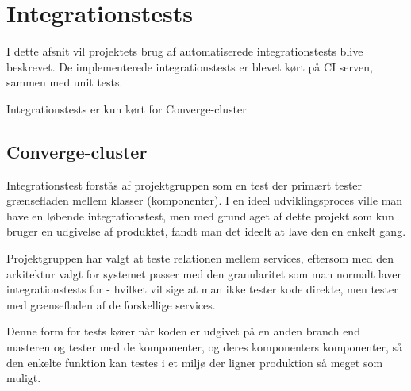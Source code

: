 \section{Integrationstests}

I dette afsnit vil projektets brug af automatiserede integrationstests blive beskrevet. De implementerede integrationstests er blevet kørt på CI serven, sammen med unit tests.

Integrationstests er kun kørt for Converge-cluster


\subsection{Converge-cluster}

Integrationstest forstås af projektgruppen som en test der primært tester grænsefladen mellem klasser (komponenter). I en ideel udviklingsproces ville man have en løbende integrationstest, men med grundlaget af dette projekt som kun bruger en udgivelse af produktet, fandt man det ideelt at lave den en enkelt gang.

Projektgruppen har valgt at teste relationen mellem services, eftersom med den arkitektur valgt for systemet passer med den granularitet som man normalt laver integrationstests for - hvilket vil sige at man ikke tester kode direkte, men tester med grænsefladen af de forskellige services.

Denne form for tests kører når koden er udgivet på en anden branch end masteren og tester med de komponenter, og deres komponenters komponenter, så den enkelte funktion kan testes i et miljø der ligner produktion så meget som muligt.
